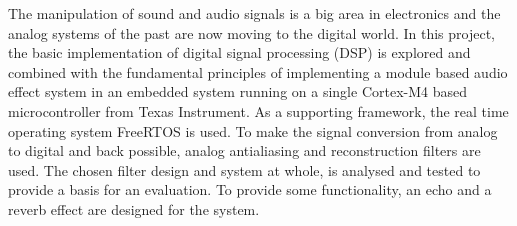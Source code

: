The manipulation of sound and audio signals is a big area in electronics and the analog systems of the past are now moving to the digital world. In this project, the basic implementation of digital signal processing (DSP) is explored and combined with the fundamental principles of implementing a module based audio effect system in an embedded system running on a single Cortex-M4 based microcontroller from Texas Instrument. As a supporting framework, the real time operating system FreeRTOS is used. To make the signal conversion from analog to digital and back possible, analog antialiasing and reconstruction filters are used. The chosen filter design and system at whole, is analysed and tested to provide a basis for an evaluation. To provide some functionality, an echo and a reverb effect are designed for the system.      